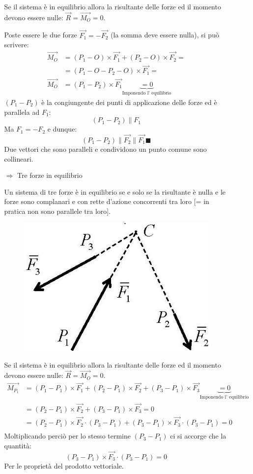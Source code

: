\documentclass{article}
\begin{document}
\begin{adjustwidth}{2in}{}
\begin{enumerate}
\begin{itemize}
Se il sistema è in equilibrio allora la risultante delle forze ed il momento devono essere nulle: $\vec{R} = \vec{M_{O}} = 0$. 

Poste essere le due forze $\vec{F_{1}} = - \vec{F_{2}}$ (la somma deve essere nulla), si può scrivere:
\[ 
\begin{split}
	\vec{M_{O}} & = (P_{1}-O)\times \vec{F_{1}} + (P_{2} -O) \times \vec{F_{2}} =\\
	& = (P_{1} - O - P_{2} - O) \times \vec{F_{1}} = \\
	\vec{M_{O}} & = (P_{1} - P_{2} ) \times \vec{F_{1}} \underbrace{= 0}_\text{Imponendo l' equilibrio}
\end{split}
	\]
	$(P_1 - P_2)$ è la congiungente dei punti di applicazione delle forze ed è parallela ad $F_1$:
	\[(P_1 - P_2) \parallel F_1\]
	Ma $F_1 = -F_2$ e dunque:
	\[
	(P_{1} - P_{2})  \parallel \vec{F_{2}} \parallel \vec{F_{1}} \blacksquare
\]
Due vettori che sono paralleli e condividono un punto comune sono collineari. \newline

\item[$\Rightarrow$] Tre forze in equilibrio

Un sistema di tre forze è in equilibrio se e solo se la risultante è nulla e le forze sono complanari e con rette d'azione concorrenti tra loro [= in pratica non sono parallele tra loro]. \newline
\begin{figure}[H]
	\centering
	\includegraphics[width=0.2\linewidth]{immagini/1.PARTE1_Pagina_15}
	\caption{}
	\label{fig:}
\end{figure}

Se il sistema è in equilibrio allora la risultante delle forze ed il momento devono essere nulle: $\vec{R} = \vec{M_{O}} = 0$.
\[ 
\begin{split}
	\vec{M_{P_{1}}} & = (P_{1}-P_{1})\times \vec{F_{1}} + (P_{2} -P_{1}) \times \vec{F_{2}} + (P_{3}- P_{1}) \times \vec{F_{3}} \underbrace{= 0}_\text{Imponendo l' equilibrio}\\
	& = (P_{2} -P_{1}) \times \vec{F_{2}} + (P_{3}- P_{1}) \times \vec{F_{3}} = 0 \\
	& = (P_{2} -P_{1}) \times \vec{F_{2}} \cdot (P_{3}- P_{1}) + (P_{3}- P_{1}) \times \vec{F_{3}} \cdot (P_{3}- P_{1}) = 0 \\
\end{split}
\]
Moltiplicando perciò per lo stesso termine $(P_{3}- P_{1})$ ci si accorge che la quantità: 
\[ (P_{3}- P_{1}) \times \vec{F_{3}} \cdot (P_{3}- P_{1}) =0 \]
Per le proprietà del prodotto vettoriale. 


\end{itemize}
\end{enumerate}
\end{adjustwidth}
\end{document}

